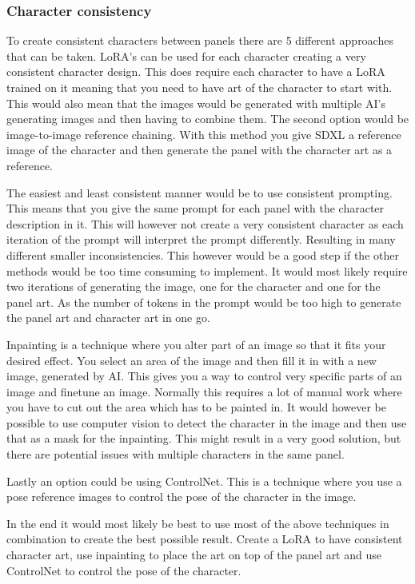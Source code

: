 \subsubsection{Character consistency}
To create consistent characters between panels there are 5 different approaches that can be taken. LoRA's can be used for each character creating a very consistent character design. This does require each character to have a LoRA trained on it meaning that you need to have art of the character to start with. This would also mean that the images would be generated with multiple AI's generating images and then having to combine them. 
The second option would be image-to-image reference chaining. With this method you give SDXL a reference image of the character and then generate the panel with the character art as a reference. 

The easiest and least consistent manner would be to use consistent prompting. This means that you give the same prompt for each panel with the character description in it. This will however not create a very consistent character as each iteration of the prompt will interpret the prompt differently. Resulting in many different smaller inconsistencies. This however would be a good step if the other methods would be too time consuming to implement. It would most likely require two iterations of generating the image, one for the character and one for the panel art. As the number of tokens in the prompt would be too high to generate the panel art and character art in one go.

Inpainting is a technique where you alter part of an image so that it fits your desired effect. You select an area of the image and then fill it in with a new image, generated by AI. This gives you a way to control very specific parts of an image and finetune an image. Normally this requires a lot of manual work where you have to cut out the area which has to be painted in. It would however be possible to use computer vision to detect the character in the image and then use that as a mask for the inpainting. This might result in a very good solution, but there are potential issues with multiple characters in the same panel.

Lastly an option could be using ControlNet. This is a technique where you use a pose reference images to control the pose of the character in the image.

In the end it would most likely be best to use most of the above techniques in combination to create the best possible result. Create a LoRA to have consistent character art, use inpainting to place the art on top of the panel art and use ControlNet to control the pose of the character. 
